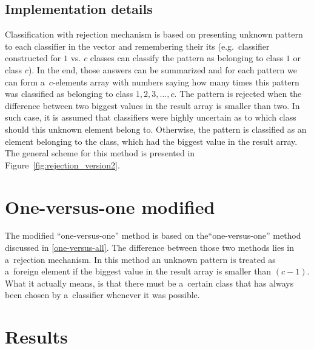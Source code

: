 \subsection{Implementation details}

Classification with rejection mechanism is based on presenting unknown pattern to each classifier in the vector and remembering their its (e.g.~classifier constructed for $1$ vs. $c$ classes can classify the pattern as belonging to class $1$ or class $c$). In the end, those answers can be summarized and for each pattern we can form a~$c$-elements array with numbers saying how many times this pattern was classified as belonging to class $1, 2, 3, \ldots, c$. The pattern is rejected when the difference between two biggest values in the result array is smaller than two. In such case, it is assumed that classifiers were highly uncertain as to which class should this unknown element belong to. Otherwise, the pattern is classified as an element belonging to the class, which had the biggest value in the result array. The general scheme for this method is presented in Figure~\ref{fig:rejection_version2}. 

\section{One-versus-one modified}

The modified ``one-versus-one'' method is based on the``one-versus-one'' method discussed in \ref{one-versus-all}. The difference between those two methods lies in a~rejection mechanism. In this method an unknown pattern is treated as a~foreign element if the biggest value in the result array is smaller than $(c-1)$. What it actually means, is that there must be a~certain class that has always been chosen by a~classifier whenever it was possible.

\section{Results}

